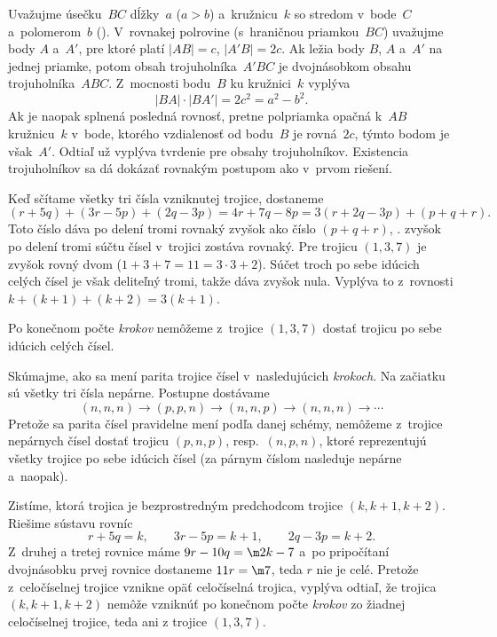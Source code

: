 {\ineriesenie
Uvažujme úsečku~$BC$ dĺžky~$a$ ($a>b$)
a~kružnicu~$k$ so stredom v~bode~$C$ a~polomerom~$b$ (\obr).
\inspicture{}
V~rovnakej polrovine (s~hraničnou priamkou~$BC$) uvažujme body $A$
a~$A'$, pre ktoré platí $|AB|=c$, $|A'B|=2c$. Ak ležia body $B$, $A$
a~$A'$ na jednej priamke, potom obsah trojuholníka~$A'BC$ je
dvojnásobkom obsahu trojuholníka~$ABC$. Z~mocnosti bodu~$B$ ku
kružnici~$k$ vyplýva
$$
|BA|\cdot |BA'|=2c^2=a^2-b^2.
$$
Ak je naopak splnená posledná rovnosť, pretne polpriamka opačná
k~$AB$ kružnicu~$k$ v~bode, ktorého vzdialenosť od bodu~$B$ je
rovná~$2c$, týmto bodom je však~$A'$. Odtiaľ už vyplýva tvrdenie pre
obsahy trojuholníkov. Existencia trojuholníkov sa dá dokázať rovnakým
postupom ako v~prvom riešení.}

{%
Keď sčítame všetky tri čísla vzniknutej trojice,
dostaneme
$$
(r+5q)+(3r-5p)+(2q-3p)=4r+7q-8p=3(r+2q-3p)+(p+q+r).
$$
Toto číslo dáva po delení tromi rovnaký zvyšok ako číslo
$(p+q+r)$, \tj. zvyšok po delení tromi súčtu čísel v~trojici
zostáva rovnaký. Pre trojicu $(1,3,7)$ je zvyšok rovný dvom
($1+3+7=11=3\cdot 3+2$).
Súčet troch po sebe idúcich celých čísel je však deliteľný tromi,
takže dáva zvyšok nula. Vyplýva to z~rovnosti
$k+(k+1)+(k+2)=3(k+1)$.

\zaver
Po konečnom počte {\it krokov} nemôžeme z~trojice
$(1,3,7)$ dostať trojicu po sebe idúcich celých čísel.

\ineriesenie
Skúmajme, ako sa mení parita trojice čísel
v~nasledujúcich {\it krokoch}. Na začiatku sú všetky tri čísla
nepárne. Postupne dostávame
$$
(n,n,n)\rightarrow (p,p,n)\rightarrow (n,n,p)\rightarrow (n,n,n)\rightarrow
\cdots
$$
Pretože sa parita čísel pravidelne mení podľa danej schémy,
nemôžeme z~trojice nepárnych čísel dostať trojicu $(p,n,p)$,
resp.~$(n,p,n)$, ktoré reprezentujú všetky trojice po sebe
idúcich čísel (za párnym číslom nasleduje nepárne a~naopak).

\ineriesenie
{}
Zistíme, ktorá trojica je bezprostredným predchodcom trojice $(k,k+1,k+2)$.
Riešime sústavu rovníc
$$
r+5q=k, \qquad 3r-5p=k+1, \qquad 2q-3p=k+2.
$$
Z~druhej a tretej rovnice máme $9r-10q=\m2k-7$ a~po pripočítaní dvojnásobku prvej
rovnice dostaneme $11r=\m7$, teda $r$ nie je celé. Pretože z~celočíselnej trojice vznikne
opäť celočíselná trojica, vyplýva odtiaľ, že trojica $(k,k+1,k+2)$ nemôže vzniknúť po konečnom počte {\it krokov} zo žiadnej celočíselnej trojice, teda ani z trojice $(1,3,7)$.}

